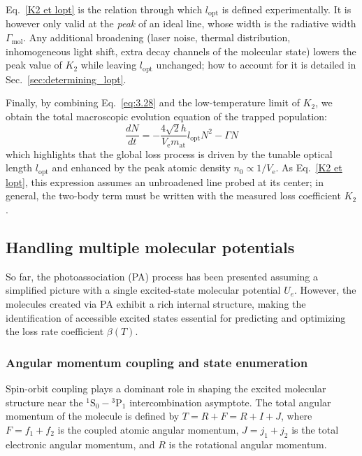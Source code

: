 Eq.~\ref{K2 et lopt} is the relation through which $l_{\text{opt}}$ is defined
experimentally. It is however only valid at the \textit{peak} of an ideal line,
whose width is the radiative width $\Gamma_{\text{mol}}$. Any additional broadening
(laser noise, thermal distribution, inhomogeneous light shift, extra decay
channels of the molecular state) lowers the peak value of $K_2$ while leaving
$l_{\text{opt}}$ unchanged; how to account for it is detailed in
Sec.~\ref{sec:determining_lopt}.

Finally, by combining Eq.~\ref{eq:3.28} and the low-temperature limit of $K_2$, we obtain the total macroscopic evolution equation of the trapped population:
\begin{equation}
    \frac{dN}{dt} = -\frac{4\sqrt{2} h }{V_{\text{e}} m_{\text{at}}}l_{\text{opt}}N^2 - \Gamma N
\label{one and two body losses equation}
\end{equation}
which highlights that the global loss process is driven by the tunable optical length $l_{\text{opt}}$ and enhanced by the peak atomic density $n_0 \propto 1/V_{\text{e}}$. As Eq.~\ref{K2 et lopt}, this expression
assumes an unbroadened line probed at its center; in general, the two-body term
must be written with the measured loss coefficient $K_2$.

\subsection{Handling multiple molecular potentials}
So far, the photoassociation (PA) process has been presented assuming a simplified picture with a single excited-state molecular potential $U_e$. However, the molecules created via PA exhibit a rich internal 
structure, making the identification of accessible excited states essential for predicting and optimizing the loss rate coefficient $\beta(T)$.

\subsubsection{Angular momentum coupling and state enumeration}
Spin-orbit coupling plays a dominant role in shaping the excited molecular structure near the $^1\text{S}_0 - {}^3\text{P}_1$ intercombination asymptote. The total angular momentum of the molecule is defined by 
$T = R + F = R + I + J$, where $F = f_1 + f_2$ is the coupled atomic angular momentum, $J = j_1 + j_2$ is the total electronic angular momentum, and $R$ is the rotational angular momentum.

